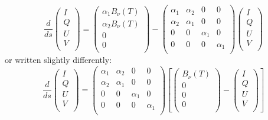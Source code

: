 \documentclass{report}
\begin{document}
\begin{equation}
\frac{d}{ds}
\left(\begin{matrix}
I \\
Q \\
U \\
V \\
\end{matrix}\right)
= \left(\begin{matrix}
\alpha_1 B_\nu(T) \\
\alpha_2 B_\nu(T) \\
0 \\
0 \\
\end{matrix}\right)
- 
\left(\begin{matrix}
\alpha_1 & \alpha_2 & 0 & 0 \\
\alpha_2 & \alpha_1 & 0 & 0  \\
0 & 0 & \alpha_1 & 0 \\
0 & 0 & 0 & \alpha_1 \\
\end{matrix}\right)
\left(\begin{matrix}
I \\
Q \\
U \\
V \\
\end{matrix}\right)
\end{equation}
or written slightly differently:
\begin{equation}
\frac{d}{ds}
\left(\begin{matrix}
I \\
Q \\
U \\
V \\
\end{matrix}\right)
=  
\left(\begin{matrix}
\alpha_1 & \alpha_2 & 0 & 0 \\
\alpha_2 & \alpha_1 & 0 & 0  \\
0 & 0 & \alpha_1 & 0 \\
0 & 0 & 0 & \alpha_1 \\
\end{matrix}\right)
\left[
\left(\begin{matrix}
B_\nu(T) \\
0 \\
0 \\
0 \\
\end{matrix}\right)
-\left(\begin{matrix}
I \\
Q \\
U \\
V \\
\end{matrix}\right)\right]
\end{equation}
\end{document}
